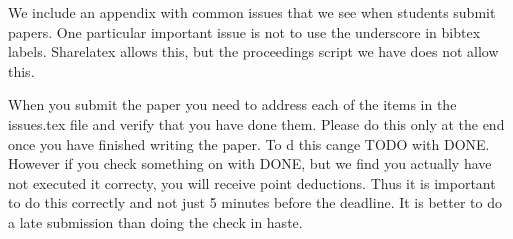 \documentclass[sigconf]{acmart}
\begin{document}
\appendix

We include an appendix with common issues that we see when students
submit papers. One particular important issue is not to use the
underscore in bibtex labels. Sharelatex allows this, but the
proceedings script we have does not allow this.

When you submit the paper you need to address each of the items in the
issues.tex file and verify that you have done them. Please do this
only at the end once you have finished writing the paper. To d this
cange TODO with DONE. However if you check something on with DONE, but
we find you actually have not executed it correcty, you will receive
point deductions. Thus it is important to do this correctly and not
just 5 minutes before the deadline. It is better to do a late
submission than doing the check in haste. 


\end{document}
